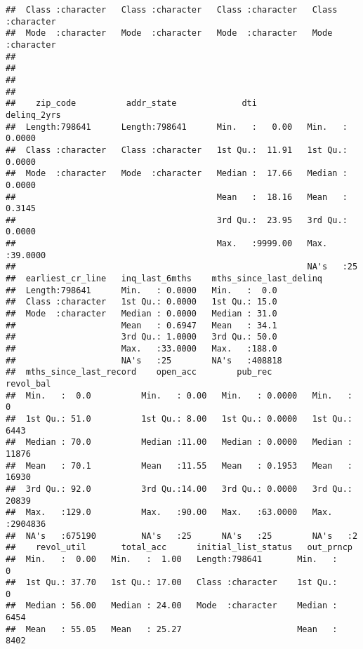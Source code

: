 \documentclass[
]{article}
\begin{document}
\begin{verbatim}
##  Class :character   Class :character   Class :character   Class :character  
##  Mode  :character   Mode  :character   Mode  :character   Mode  :character  
##                                                                             
##                                                                             
##                                                                             
##                                                                             
##    zip_code          addr_state             dti           delinq_2yrs     
##  Length:798641      Length:798641      Min.   :   0.00   Min.   : 0.0000  
##  Class :character   Class :character   1st Qu.:  11.91   1st Qu.: 0.0000  
##  Mode  :character   Mode  :character   Median :  17.66   Median : 0.0000  
##                                        Mean   :  18.16   Mean   : 0.3145  
##                                        3rd Qu.:  23.95   3rd Qu.: 0.0000  
##                                        Max.   :9999.00   Max.   :39.0000  
##                                                          NA's   :25       
##  earliest_cr_line   inq_last_6mths    mths_since_last_delinq
##  Length:798641      Min.   : 0.0000   Min.   :  0.0         
##  Class :character   1st Qu.: 0.0000   1st Qu.: 15.0         
##  Mode  :character   Median : 0.0000   Median : 31.0         
##                     Mean   : 0.6947   Mean   : 34.1         
##                     3rd Qu.: 1.0000   3rd Qu.: 50.0         
##                     Max.   :33.0000   Max.   :188.0         
##                     NA's   :25        NA's   :408818        
##  mths_since_last_record    open_acc        pub_rec          revol_bal      
##  Min.   :  0.0          Min.   : 0.00   Min.   : 0.0000   Min.   :      0  
##  1st Qu.: 51.0          1st Qu.: 8.00   1st Qu.: 0.0000   1st Qu.:   6443  
##  Median : 70.0          Median :11.00   Median : 0.0000   Median :  11876  
##  Mean   : 70.1          Mean   :11.55   Mean   : 0.1953   Mean   :  16930  
##  3rd Qu.: 92.0          3rd Qu.:14.00   3rd Qu.: 0.0000   3rd Qu.:  20839  
##  Max.   :129.0          Max.   :90.00   Max.   :63.0000   Max.   :2904836  
##  NA's   :675190         NA's   :25      NA's   :25        NA's   :2        
##    revol_util       total_acc      initial_list_status   out_prncp    
##  Min.   :  0.00   Min.   :  1.00   Length:798641       Min.   :    0  
##  1st Qu.: 37.70   1st Qu.: 17.00   Class :character    1st Qu.:    0  
##  Median : 56.00   Median : 24.00   Mode  :character    Median : 6454  
##  Mean   : 55.05   Mean   : 25.27                       Mean   : 8402  

\end{verbatim}
\end{document}
